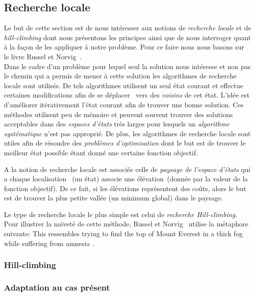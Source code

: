 
\subsection{Recherche locale}

Le but de cette section est de nous intéresser aux notions de \emph{recherche locale} et de \emph{hill-climbing} dont nous présentons les principes ainsi que de nous interroger quant à la façon de les appliquer à notre problème. Pour ce faire nous nous basons sur le livre Russel et Norvig~\cite{artInt}.\\

Dans le cadre d'un problème pour lequel seul la solution nous intéresse et non pas le chemin qui a permis de mener à cette solution les algorithmes de recherche locale sont utilisés. De tels algorithmes utilisent un seul état courant et effectue certaines modifications afin de \og se déplacer \fg~vers des \emph{voisins} de cet état. L'idée est d'améliorer itérativement l'état courant afin de trouver une bonne solution. Ces méthodes utilisent peu de mémoire et peuvent souvent trouver des solutions acceptables dans des \emph{espaces d'états} très larges pour lesquels un \emph{algorithme systématique} n'est pas approprié. De plus, les algorithmes de recherche locale sont utiles afin de résoudre des \emph{problèmes d'optimisation} dont le but est de trouver le meilleur état possible étant donné une certaine fonction objectif.

A la notion de recherche locale est associée celle de \emph{paysage de l'espace d'états} qui a chaque \og localisation \fg~(un état) associe une \og élévation\fg~(donnée par la valeur de la fonction objectif). De ce fait, si les élévations représentent des coûts, alors le but est de trouver la plus petite vallée (un minimum global) dans le paysage.

Le type de recherche locale le plus simple est celui de \emph{recherche Hill-climbing}. Pour illustrer la naïveté de cette méthode, Russel et Norvig~\cite{artInt} utilise la métaphore suivante: \og This ressembles trying to find the top of Mount Everest in a thick fog while suffering from amnesia \fg.

\subsubsection{Hill-climbing}
\subsubsection{Adaptation au cas présent}
